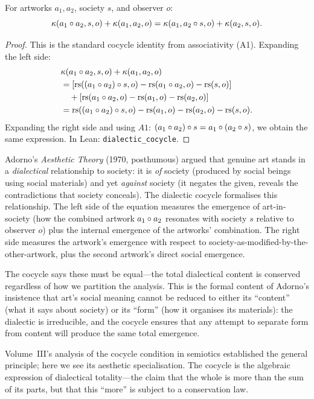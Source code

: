 \begin{theorem}
\label{thm:dialectic-cocycle}
For artworks $a_1, a_2$, society $s$, and observer $o$:
\[
  \kappa(a_1 \circ a_2, s, o) + \kappa(a_1, a_2, o) = \kappa(a_1, a_2 \circ s, o) + \kappa(a_2, s, o).
\]
\end{theorem}

\begin{proof}
This is the standard cocycle identity from associativity (A1).  Expanding the left side:
\begin{align*}
  &\kappa(a_1 \circ a_2, s, o) + \kappa(a_1, a_2, o) \\
  &= [\mathrm{rs}((a_1 \circ a_2) \circ s, o) - \mathrm{rs}(a_1 \circ a_2, o) - \mathrm{rs}(s, o)] \\
  &\quad + [\mathrm{rs}(a_1 \circ a_2, o) - \mathrm{rs}(a_1, o) - \mathrm{rs}(a_2, o)] \\
  &= \mathrm{rs}((a_1 \circ a_2) \circ s, o) - \mathrm{rs}(a_1, o) - \mathrm{rs}(a_2, o) - \mathrm{rs}(s, o).
\end{align*}
Expanding the right side and using $A1$: $(a_1 \circ a_2) \circ s = a_1 \circ (a_2 \circ s)$, we obtain the same expression.  In Lean: \texttt{dialectic\_cocycle}.
\end{proof}

\begin{interpretation}
\label{interp:adorno-dialectic}
Adorno's \textit{Aesthetic Theory} (1970, posthumous) argued that genuine art stands in a \emph{dialectical} relationship to society: it is \emph{of} society (produced by social beings using social materials) and yet \emph{against} society (it negates the given, reveals the contradictions that society conceals).  The dialectic cocycle formalises this relationship.  The left side of the equation measures the emergence of art-in-society (how the combined artwork $a_1 \circ a_2$ resonates with society $s$ relative to observer $o$) plus the internal emergence of the artworks' combination.  The right side measures the artwork's emergence with respect to society-as-modified-by-the-other-artwork, plus the second artwork's direct social emergence.

The cocycle says these must be equal---the total dialectical content is conserved regardless of how we partition the analysis.  This is the formal content of Adorno's insistence that art's social meaning cannot be reduced to either its ``content'' (what it says about society) or its ``form'' (how it organises its materials): the dialectic is irreducible, and the cocycle ensures that any attempt to separate form from content will produce the same total emergence.

Volume~III's analysis of the cocycle condition in semiotics established the general principle; here we see its aesthetic specialisation.  The cocycle is the algebraic expression of dialectical totality---the claim that the whole is more than the sum of its parts, but that this ``more'' is subject to a conservation law.
\end{interpretation}

